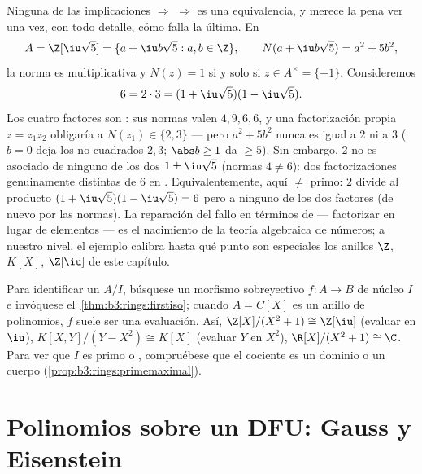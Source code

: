 \begin{example}
\label{ex:b3:rings:nonufd}
Ninguna de las implicaciones 
$\Rightarrow$  $\Rightarrow$
 es una equivalencia, y merece la pena
ver una vez, con todo detalle, cómo falla la última. En
\[
A = \Z[\iu\sqrt5] = \{a + \iu b\sqrt5 : a, b \in \Z\},
\qquad N(a + \iu b\sqrt5) = a^2 + 5b^2,
\]
la norma es multiplicativa y $N(z) = 1$ si y solo si $z \in
A^\times = \{\pm1\}$. Consideremos
\[
6 = 2 \cdot 3 = (1 + \iu\sqrt5)(1 - \iu\sqrt5).
\]
Los cuatro factores son
: sus normas valen
$4, 9, 6,
6$, y una factorización propia $z = z_1z_2$ obligaría a
$N(z_1) \in \{2, 3\}$ --- pero $a^2 + 5b^2$ nunca es igual a $2$ ni a
$3$ ($b = 0$ deja los no cuadrados $2, 3$; $\abs b \geq
1$ da $\geq 5$). Sin embargo, $2$ no es asociado de ninguno de los dos
$1 \pm
\iu\sqrt5$ (normas $4 \neq 6$): dos factorizaciones genuinamente
distintas de $6$ en .
Equivalentemente, aquí 
$\neq$ primo: $2$ divide al producto $(1 +
\iu\sqrt5)(1 - \iu\sqrt5) = 6$ pero a ninguno de los dos factores (de
nuevo por las normas). La reparación del fallo en términos de 
--- factorizar \emph{} en lugar de
elementos --- es el nacimiento de la teoría algebraica de números; a
nuestro nivel, el ejemplo calibra hasta qué punto son especiales los
anillos  $\Z$, $K[X]$, $\Z[\iu]$
de este capítulo.
\end{example}

\begin{method}\label{met:b3:rings:quotient}
Para identificar un  $A/I$,
búsquese un morfismo sobreyectivo $f \colon A \to B$ de núcleo $I$ e
invóquese el~\cref{thm:b3:rings:firstiso}; cuando $A = C[X]$ es un
anillo de polinomios, $f$ suele ser una evaluación. Así,
$\Z[X]/(X^2+1) \cong
\Z[\iu]$ (evaluar en $\iu$), $K[X,Y]/(Y - X^2) \cong K[X]$ (evaluar $Y$
en $X^2$), $\R[X]/(X^2+1) \cong \C$. Para ver que $I$ es primo o
, compruébese que el cociente
es un dominio o un cuerpo
(\cref{prop:b3:rings:primemaximal}).
\end{method}

\section{Polinomios sobre un DFU: Gauss y Eisenstein}

